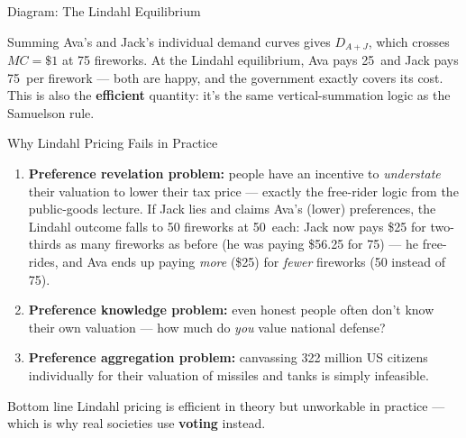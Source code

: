 \documentclass[11pt,aspectratio=169]{beamer}
\begin{document}
\begin{frame}{Diagram: The Lindahl Equilibrium}
  \begin{center}
  \end{center}
  \footnotesize Summing Ava's and Jack's individual demand curves gives $D_{A+J}$, which crosses $MC=\$1$ at 75 fireworks. At the Lindahl equilibrium, Ava pays 25\textcent\ and Jack pays 75\textcent\ per firework --- both are happy, and the government exactly covers its cost. This is also the \textbf{efficient} quantity: it's the same vertical-summation logic as the Samuelson rule.
\end{frame}

\begin{frame}{Why Lindahl Pricing Fails in Practice}
  \small
  \begin{enumerate}
    \setlength{\itemsep}{4pt}
    \item \textbf{Preference revelation problem:} people have an incentive to \emph{understate} their valuation to lower their tax price --- exactly the free-rider logic from the public-goods lecture. If Jack lies and claims Ava's (lower) preferences, the Lindahl outcome falls to 50 fireworks at 50\textcent\ each: Jack now pays \$25 for two-thirds as many fireworks as before (he was paying \$56.25 for 75) --- he free-rides, and Ava ends up paying \emph{more} (\$25) for \emph{fewer} fireworks (50 instead of 75).
    \item \textbf{Preference knowledge problem:} even honest people often don't know their own valuation --- how much do \emph{you} value national defense?
    \item \textbf{Preference aggregation problem:} canvassing 322 million US citizens individually for their valuation of missiles and tanks is simply infeasible.
  \end{enumerate}
  \vspace{0.3em}
  \begin{alertblock}{Bottom line}
    Lindahl pricing is efficient in theory but unworkable in practice --- which is why real societies use \textbf{voting} instead.
  \end{alertblock}
\end{frame}
\end{document}
